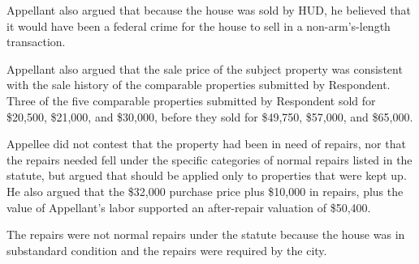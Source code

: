 Appellant also argued that because the house was sold by HUD, he believed that it would have been a federal crime for the house to sell in a non-arm's-length transaction.

Appellant also argued that the sale price of the subject property was consistent with the sale history of the comparable properties submitted by Respondent. Three of the five comparable properties submitted by Respondent sold for \$20,500, \$21,000, and \$30,000, before they sold for \$49,750, \$57,000, and \$65,000.


Appellee did not contest that the property had been in need of repairs, nor that the repairs needed fell under the specific categories of normal repairs listed in the statute, but argued that  should be applied only to properties that were kept up.
He also argued that the \$32,000 purchase price plus \$10,000 in repairs, plus the value of Appellant's labor supported an after-repair valuation of \$50,400.

The repairs were not normal repairs under the statute because the house was in substandard condition and the repairs were required by the city. 



